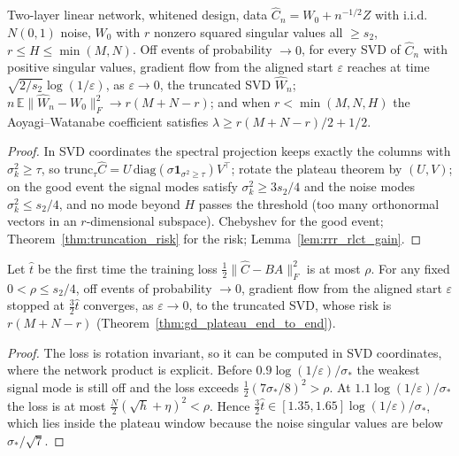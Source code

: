 \begin{theorem}\label{thm:gd_plateau_end_to_end}
\leanok
Two-layer linear network, whitened design, data $\widehat C_n=W_0+n^{-1/2}Z$ with
i.i.d.\ $N(0,1)$ noise, $W_0$ with $r$ nonzero squared singular values all $\ge s_2$,
$r\le H\le\min(M,N)$. Off events of probability $\to0$, for every SVD of $\widehat C_n$
with positive singular values, gradient flow from the aligned start $\varepsilon$ reaches
at time $\sqrt{2/s_2}\log(1/\varepsilon)$, as $\varepsilon\to0$, the truncated SVD
$\widehat W_n$; $n\,\mathbb E\|\widehat W_n-W_0\|_F^2\to r(M+N-r)$; and when $r<\min(M,N,H)$
the Aoyagi--Watanabe coefficient satisfies $\lambda\ge r(M+N-r)/2+1/2$.
\end{theorem}
\begin{proof}
\leanok
In SVD coordinates the spectral projection keeps exactly the columns with $\sigma_k^2\ge\tau$,
so $\mathrm{trunc}_\tau\widehat C=U\,\mathrm{diag}(\sigma\mathbf 1_{\sigma^2\ge\tau})V^\top$;
rotate the plateau theorem by $(U,V)$; on the good event the signal modes satisfy
$\sigma_k^2\ge3s_2/4$ and the noise modes $\sigma_k^2\le s_2/4$, and no mode beyond $H$ passes
the threshold (too many orthonormal vectors in an $r$-dimensional subspace). Chebyshev for
the good event; Theorem~\ref{thm:truncation_risk} for the risk; Lemma~\ref{lem:rrr_rlct_gain}.
\end{proof}

\begin{theorem}\label{thm:stopping_rule}
\leanok
Let $\hat t$ be the first time the training loss $\tfrac12\|\widehat C-BA\|_F^2$ is at most $\rho$.
For any fixed $0<\rho\le s_2/4$, off events of probability $\to0$, gradient flow from the
aligned start $\varepsilon$ stopped at $\tfrac32\hat t$ converges, as $\varepsilon\to0$, to the
truncated SVD, whose risk is $r(M+N-r)$ (Theorem~\ref{thm:gd_plateau_end_to_end}).
\end{theorem}
\begin{proof}
\leanok
The loss is rotation invariant, so it can be computed in SVD coordinates, where the network
product is explicit. Before $0.9\log(1/\varepsilon)/\sigma_*$ the weakest signal mode is still off
and the loss exceeds $\tfrac12(7\sigma_*/8)^2>\rho$. At $1.1\log(1/\varepsilon)/\sigma_*$ the loss is
at most $\tfrac N2(\sqrt h+\eta)^2<\rho$. Hence $\tfrac32\hat t\in[1.35,1.65]\log(1/\varepsilon)/\sigma_*$,
which lies inside the plateau window because the noise singular values are below $\sigma_*/\sqrt7$.
\end{proof}

